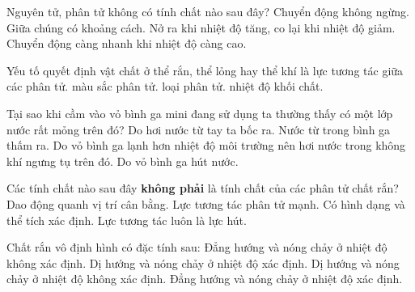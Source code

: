 \begin{ex}
Nguyên tử, phân tử không có tính chất nào sau đây?
\choice
{Chuyển động không ngừng.}
{Giữa chúng có khoảng cách.}
{\True Nở ra khi nhiệt độ tăng, co lại khi nhiệt độ giảm.}
{Chuyển động càng nhanh khi nhiệt độ càng cao.}
\end{ex}


\begin{ex}
Yếu tố quyết định vật chất ở thể rắn, thể lỏng hay thể khí là
\choice
{\True lực tương tác giữa các phân tử.}
{màu sắc phân tử.}
{loại phân tử.}
{nhiệt độ khối chất.}
\end{ex}


\begin{ex}
Tại sao khi cầm vào vỏ bình ga mini đang sử dụng ta thường thấy có một lớp nước rất mỏng trên đó?
\choice
{Do hơi nước từ tay ta bốc ra.}
{Nước từ trong bình ga thấm ra.}
{\True Do vỏ bình ga lạnh hơn nhiệt độ môi trường nên hơi nước trong không khí ngưng tụ trên đó.}
{Do vỏ bình ga hút nước.}
\end{ex}


\begin{ex}
Các tính chất nào sau đây \textbf{không phải} là tính chất của các phân tử chất rắn?
\choice
{Dao động quanh vị trí cân bằng.}
{Lực tương tác phân tử mạnh.}
{Có hình dạng và thể tích xác định.}
{\True Lực tương tác luôn là lực hút.}
\end{ex}


\begin{ex}
Chất rắn vô định hình có đặc tính sau:
\choice
{\True Đẳng hướng và nóng chảy ở nhiệt độ không xác định.}
{Dị hướng và nóng chảy ở nhiệt độ xác định.}
{Dị hướng và nóng chảy ở nhiệt độ không xác định.}
{Đẳng hướng và nóng chảy ở nhiệt độ xác định.}
\end{ex}


